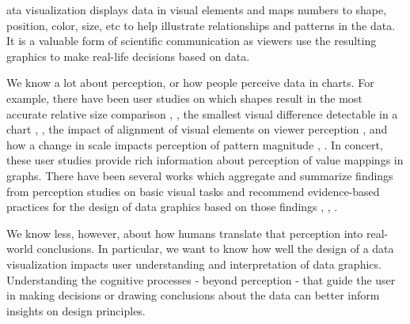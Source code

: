 \documentclass{IEEEcsmag}
\begin{document}
\maketitle

ata visualization displays data in visual elements and maps numbers to shape, position, color, size, etc to help illustrate relationships and patterns in the data. It is a valuable form of scientific communication as viewers use the resulting graphics to make real-life decisions based on data.

We know a lot about perception, or how people perceive data in charts. For example, there have been user studies on which shapes result in the most accurate relative size comparison , , the smallest visual difference detectable in a chart , , the impact of alignment of visual elements on viewer perception , and how a change in scale impacts perception of pattern magnitude , . In concert, these user studies provide rich information about perception of value mappings in graphs. There have been several works which aggregate and summarize findings from perception studies on basic visual tasks and recommend evidence-based practices for the design of data graphics based on those findings , , .

We know less, however, about how humans translate that perception into real-world conclusions. In particular, we want to know how well the design of a data visualization impacts user understanding and interpretation of data graphics. Understanding the cognitive processes - beyond perception - that guide the user in making decisions or drawing conclusions about the data can better inform insights on design principles.
\end{document}
